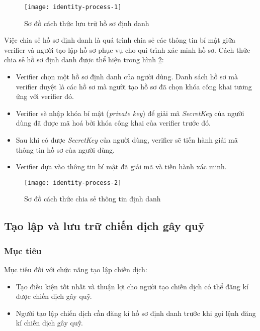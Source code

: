\documentclass[../main-report.tex]{subfiles}
\begin{document}
\begin{figure}[ht!]
\begin{center}
\label{fig:identity-process-1}
\texttt{[image: identity-process-1]}
\caption{Sơ đồ cách thức lưu trữ hồ sơ định danh}
\end{center}
\end{figure}

Việc chia sẻ hồ sơ định danh là quá trình chia sẻ các thông tin bí mật giữa verifier và người tạo lập hồ sơ phục vụ cho qui trình xác minh hồ sơ. Cách thức chia sẻ hồ sơ định danh được thể hiện trong hình \ref{fig:identity-process-2}:

\begin{itemize}
\item Verifier chọn một hồ sơ định danh của người dùng. Danh sách hồ sơ mà verifier duyệt là các hồ sơ mà người tạo hồ sơ đã chọn khóa công khai tương ứng với verifier đó.
\item Verifier sẽ nhập khóa bí mật (\textit{private key}) để giải mã \textit{SecretKey} của người dùng đã được mã hoá bởi khóa công khai của verifier trước đó.
\item Sau khi có được \textit{SecretKey} của người dùng, verifier sẽ tiến hành giải mã thông tin hồ sơ của người dùng.
\item Verifier dựa vào thông tin bí mật đã giải mã và tiến hành xác minh.
\end{itemize}

\begin{figure}[ht!]
\begin{center}
\label{fig:identity-process-2}
\texttt{[image: identity-process-2]}
\caption{Sơ đồ cách thức chia sẻ thông tin định danh}
\end{center}
\end{figure}

\subsection{Tạo lập và lưu trữ chiến dịch gây quỹ}
\subsubsection{Mục tiêu}
Mục tiêu đối với chức năng tạo lập chiến dịch:

\begin{itemize}
\item Tạo điều kiện tốt nhất và thuận lợi cho người tạo chiến dịch có thể đăng kí được chiến dịch gây quỹ.
\item Người tạo lập chiến dịch cần đăng kí hồ sơ định danh trước khi gọi lệnh đăng kí chiến dịch gây quỹ.
\end{itemize}
\end{document}
